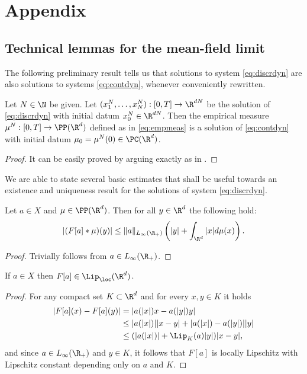 
\section{Appendix}

\subsection{Technical lemmas for the mean-field limit}\label{ap1}

The following preliminary result tells us that solutions to system \eqref{eq:discrdyn} are also solutions to systems \eqref{eq:contdyn}, whenever conveniently rewritten.

\begin{proposition}\label{p-rewritten}
Let $N \in \N$ be given. Let $(x^N_1, \ldots, x^N_N):[0,T] \rightarrow \R^{dN}$ be the solution of \eqref{eq:discrdyn} with initial datum $x^{N}_0 \in \R^{dN}$. Then the empirical measure $\mu^N:[0,T] \rightarrow \PP(\R^d)$ defined as in \eqref{eq:empmeas} is a solution of \eqref{eq:contdyn} with initial datum $\mu_{0}= \mu^N(0) \in \PC(\R^d)$.
\end{proposition}
\begin{proof}
It can be easily proved by arguing exactly as in \cite[Lemma 4.3]{MFOC}.
\end{proof}

 We are able to state several basic estimates that shall be useful towards an existence and uniqueness result for the solutions of system \eqref{eq:discrdyn}.

\begin{lemma}\label{p-estkernel}
Let $a\in X$ and $\mu \in \PP(\R^d)$. Then for all $y \in \R^d$ the following hold:
\begin{align*}
|(F[a] * \mu)(y)| \leq \|a\|_{L_{\infty}(\R_+)}\left( | y | + \int_{\R^d} | x | d\mu(x) \right).
\end{align*}
\end{lemma}
\begin{proof}
Trivially follows from $a \in L_{\infty}(\R_+)$.
\end{proof}

\begin{lemma}\label{p-Floclip}
If $a\in X$ then $F[a] \in \Lip_\loc(\R^d)$.
\end{lemma}
\begin{proof}
For any compact set $K \subset \R^d$ and for every $x,y \in K$ it holds
\begin{align*}
|F[a](x) - F[a](y)| &= |a(|x|)x - a(|y|)y| \\
&\leq |a(|x|)| |x-y| + |a(|x|) - a(|y|)| |y| \\
&\leq (|a(|x|)| + \Lip_K(a) |y|) |x-y|,
\end{align*}
and since $a \in L_{\infty}(\R_+)$ and $y \in K$, it follows that $F[a]$ is locally Lipschitz with Lipschitz constant depending only on $a$ and $K$.
\end{proof}

